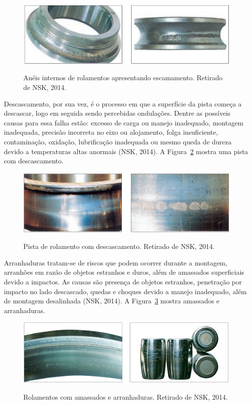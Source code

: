 \documentclass[
	12pt,				
	oneside,			
	a4paper,			
	english,			
	brazil,			
	]{abntex2ppgsi}
\begin{document}
\begin{figure}[H]
\centering
\caption {Anéis internos de rolamentos apresentando escamamento. Retirado de NSK, 2014.}
\includegraphics[width=\textwidth,height=\textheight,keepaspectratio]{escamamento_nsk}
\label{escamemento_nsk}
\end{figure}

Descascamento, por sua vez, é o processo em que a superfície da pista começa a descascar, logo em seguida sendo percebidas ondulações. Dentre as possíveis causas para essa falha estão: excesso de carga ou manejo inadequado, montagem inadequada, precisão incorreta no eixo ou alojamento, folga insuficiente, contaminação, oxidação, lubrificação inadequada ou mesmo queda de dureza devido a temperaturas altas anormais (NSK, 2014). A Figura~\ref{descascamento_nsk} mostra uma pista com descascamento.

\begin{figure}[H]
\centering
\caption {Pista de rolamento com descascamento. Retirado de NSK, 2014.}
\includegraphics[width=\textwidth,height=\textheight,keepaspectratio]{descascamento_nsk}
\label{descascamento_nsk}
\end{figure}

Arranhaduras tratam-se de riscos que podem ocorrer durante a montagem, arranhões em razão de objetos estranhos e duros, além de amassados superficiais devido a impactos. As causas são presença de objetos estranhos, penetração por impacto no lado descascado, quedas e choques devido a manejo inadequado, além de montagem desalinhada (NSK, 2014). A Figura~\ref{arranhaduras_nsk} mostra amassados e arranhaduras. 

\begin{figure}[H]
\centering
\caption {Rolamentos com amassados e arranhaduras. Retirado de NSK, 2014.}
\includegraphics[width=\textwidth,height=\textheight,keepaspectratio]{arranhaduras_nsk}
\label{arranhaduras_nsk}
\end{figure}
\end{document}
